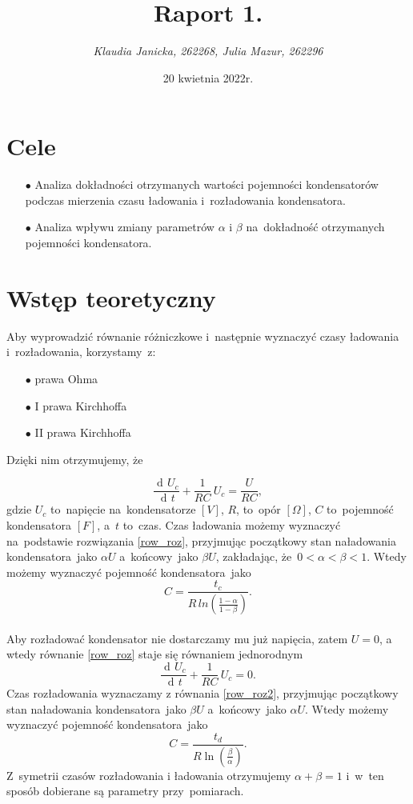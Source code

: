 \documentclass[12pt]{mwart}
\title{\textbf{Raport 1.}}
\author{\fontsize{12pt}{12pt}\selectfont \emph{Klaudia Janicka, 262268, Julia Mazur, 262296}}
\date{20 kwietnia 2022r.}
\DeclareMathOperator{\diff}{d\!}
\begin{document}
	\maketitle
	\section{Cele}
	\begin{itemize}
		\item[$\bullet$] Analiza dokładności otrzymanych wartości pojemności kondensatorów podczas mierzenia czasu ładowania i~rozładowania kondensatora.
		\item[$\bullet$] Analiza wpływu zmiany parametrów $\alpha$ i $\beta$ na~dokładność otrzymanych pojemności kondensatora.
	\end{itemize}
	\section{Wstęp teoretyczny}
	\noindent Aby wyprowadzić równanie różniczkowe i~następnie wyznaczyć czasy ładowania i~rozładowania, korzystamy~z:
	\begin{itemize}
		\item[$\bullet$] prawa Ohma
		\item[$\bullet$] I prawa Kirchhoffa
		\item[$\bullet$] II prawa Kirchhoffa
	\end{itemize}
	Dzięki nim otrzymujemy, że 
	
	\begin{equation}\label{row_roz}
		\frac{\diff U_{c}}{\diff t} +\frac{1}{RC}\, U_{c}=\frac{U}{RC},
	\end{equation}
	gdzie $U_{c}$ to~napięcie na~kondensatorze $\left[V\right]$, $R$, to~opór $\left[\Omega\right]$, $C$ to~pojemność kondensatora $\left[F\right]$, a~$t$ to~czas.
	Czas ładowania możemy wyznaczyć na~podstawie rozwiązania \eqref{row_roz}, przyjmując początkowy stan naładowania kondensatora~jako $\alpha U$ a~końcowy~jako $\beta U$, zakładając, że~$0 < \alpha < \beta < 1$. Wtedy możemy wyznaczyć pojemność kondensatora~jako $$C=\frac{t_{c}}{R\,ln\left(\frac{1-\alpha}{1-\beta}\right)}.$$\label{poj_lad}
	\phantom{a}\\
	Aby rozładować kondensator nie dostarczamy mu już napięcia, zatem $U = 0$, a wtedy równanie \eqref{row_roz} staje się równaniem jednorodnym
	\begin{equation}\label{row_roz2}
		\frac{\diff U_{c}}{\diff t} +\frac{1}{RC}\, U_{c}=0.
	\end{equation}
	Czas rozładowania wyznaczamy z równania \eqref{row_roz2}, przyjmując początkowy stan naładowania kondensatora~jako $\beta U$ a~końcowy~jako $\alpha U$. Wtedy możemy wyznaczyć pojemność kondensatora~jako
	$$C=\frac{t_d}{R\ln\left({\frac{\beta}{\alpha}}\right)}.$$
	Z~symetrii czasów rozładowania i ładowania otrzymujemy $\alpha+\beta=1$ i~w~ten sposób dobierane są parametry przy~pomiarach.
\end{document}
